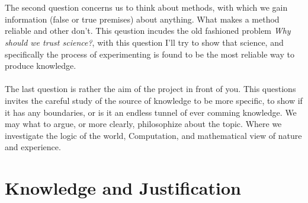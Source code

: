 \documentclass[10pt,a4paper]{article}
\begin{document}
                \\
                \\
                \indent The second question concerns us to think about methods, with which we gain information (false or true premises) about anything. What makes a method reliable and other don't. This qeustion incudes the old fashioned problem \textit{Why should we trust science?}, with this question I'll try to show that science, and specifically the process of experimenting is found to be the most reliable way to produce knowledge.
                \\
                \\
                \indent The last question is rather the aim of the project in front of you. This questions invites the careful study of the source of knowledge to be more specific, to show if it has any boundaries, or is it an endless tunnel of ever comming knowledge. We may what to argue, or more clearly, philosophize about the topic. Where we investigate the logic of the world, Computation, and mathematical view of nature and experience.
            
            \section{Knowledge and Justification}
\end{document}
